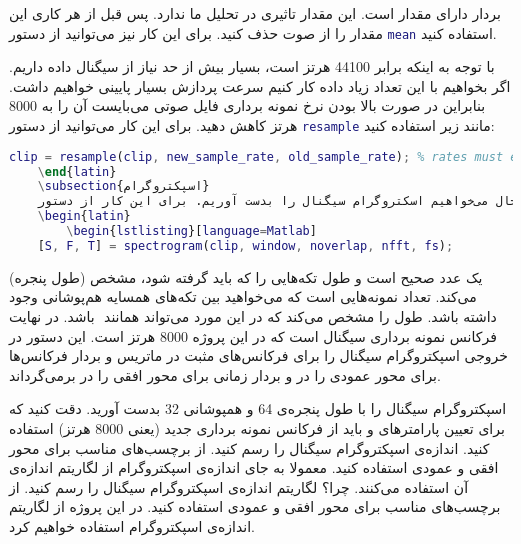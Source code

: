 \documentclass{utsignal}
\begin{document}
	بردار  دارای مقدار  است. این مقدار تاثیری در تحلیل ما ندارد. پس قبل از هر کاری این مقدار را از صوت حذف کنید. برای این کار نیز می‌توانید از دستور \lstinline[language=Matlab]{mean} استفاده کنید.
	
	با توجه به اینکه  برابر 44100 هرتز است، بسیار بیش از حد نیاز از سیگنال داده داریم. اگر بخواهیم با این تعداد زیاد داده کار کنیم سرعت پردازش بسیار پایینی خواهیم داشت. بنابراین در صورت بالا بودن نرخ نمونه برداری فایل صوتی می‌بایست آن را به 8000 هرتز کاهش دهید. برای این کار می‌توانید از دستور \lstinline[language=Matlab]{resample} مانند زیر استفاده کنید:
	\begin{latin}
		\begin{lstlisting}[language=Matlab]
	clip = resample(clip, new_sample_rate, old_sample_rate); % rates must each be integers.\end{lstlisting}
	\end{latin}
	\subsection{اسپکتروگرام}
	حال می‌خواهیم اسکتروگرام سیگنال را بدست آوریم. برای این کار از دستور \lstinline[language=Matlab]{spectrogram} استفاده کنید. با دستور در تمرین کامپیوتری دوم آشنا شدید. این دستور را به شکل زیر استفاده کنید:
	\begin{latin}
		\begin{lstlisting}[language=Matlab]
	[S, F, T] = spectrogram(clip, window, noverlap, nfft, fs);\end{lstlisting}
	\end{latin}
	 (طول پنجره) یک عدد صحیح است و طول تکه‌هایی را که باید   گرفته شود، مشخص می‌کند.  تعداد نمونه‌هایی است که می‌خواهید بین تکه‌های همسایه هم‌پوشانی وجود داشته باشد.  طول  را مشخص می‌کند که در این مورد می‌تواند همانند ‌ باشد. در نهایت  فرکانس نمونه برداری سیگنال است که در این پروژه 8000 هرتز است. این دستور در خروجی اسپکتروگرام سیگنال را برای فرکانس‌های مثبت در ماتریس  و بردار فرکانس‌ها برای محور عمودی را در  و بردار زمانی برای محور افقی را در  برمی‌گرداند.
	
	اسپکتروگرام سیگنال را با طول پنجره‌ی 64 و همپوشانی 32 بدست آورید. دقت کنید که برای تعیین پارامتر‌های  و  باید از فرکانس نمونه برداری جدید (یعنی 8000 هرتز) استفاده کنید.  اندازه‌ی اسپکتروگرام سیگنال را رسم کنید. از برچسب‌های مناسب برای محور افقی و عمودی استفاده کنید. معمولا به جای اندازه‌ی اسپکتروگرام از لگاریتم اندازه‌ی آن استفاده می‌کنند. چرا؟ لگاریتم اندازه‌ی اسپکتروگرام سیگنال را رسم کنید. از برچسب‌های مناسب برای محور افقی و عمودی استفاده کنید. در این پروژه از لگاریتم اندازه‌ی اسپکتروگرام استفاده خواهیم کرد.
\end{document}
